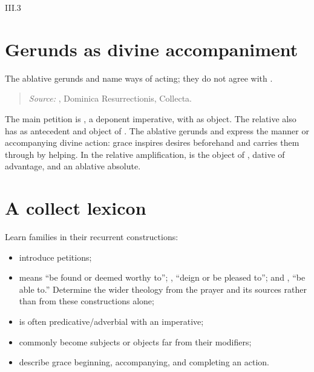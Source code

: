 \begin{courseunit}{III.3}
\section{Gerunds as divine accompaniment}

The ablative gerunds  and  name ways of
acting; they do not agree with .

\begin{quote}

\emph{Source:} \Missal, Dominica Resurrectionis, Collecta.
\end{quote}

The main petition is , a deponent imperative, with
 as object. The relative  also has
 as antecedent and object of . The ablative gerunds
 and  express the manner or accompanying
divine action: grace inspires desires beforehand and carries them through by
helping. In the relative amplification,  is the object of
,  dative of advantage, and
 an ablative absolute.

\section{A collect lexicon}

Learn families in their recurrent constructions:
\begin{itemize}
  \item {} introduce petitions;
  \item {} means ``be found or deemed worthy to'';
    , ``deign or be pleased to''; and
    , ``be able to.'' Determine the wider theology
    from the prayer and its sources rather than from these constructions alone;
  \item {} is often predicative/adverbial with an imperative;
  \item {} commonly become
    subjects or objects far from their modifiers;
  \item {} describe grace beginning,
    accompanying, and completing an action.
\end{itemize}




\end{courseunit}

